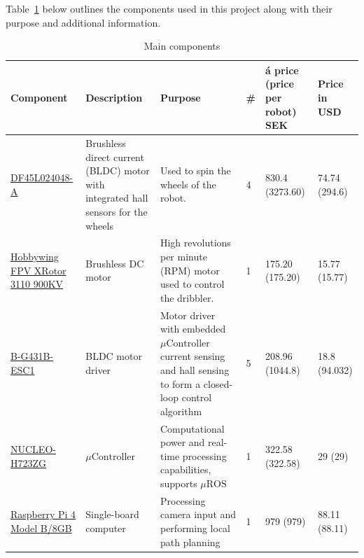 \documentclass[a4paper,8pt]{article}
\begin{document}
Table~\ref{table:bom} below outlines the components used in this project along
with their purpose and additional information.
\begin{center}
	\begin{longtable}{|p{3cm}|p{3cm}|p{3cm}|p{1cm}|p{3cm}|p{3cm}|}
		\caption{Main components}
    \label{table:bom}
		\\ \hline \rowcolor{gray!50} \textbf{Component} & \textbf{Description} & \textbf{Purpose} & \textbf{\#} & \textbf{á price (price per robot) SEK} & \textbf{Price in USD}\\ \endhead \hline


		\href{https://www.nanotec.com/fileadmin/files/Datenblaetter/BLDC/DF45/DF45L024048-A.pdf?1656012533}{DF45L024048-A}              & Brushless direct current (BLDC) motor with integrated hall sensors for the wheels & Used to spin the wheels of the robot.                                                                                      & 4  & 830.4 (3273.60) & 74.74 (294.6) \\ \hline
		\href{https://www.hobbywing.com/en/products/xrotor3110}{Hobbywing FPV XRotor 3110 900KV}                                        & Brushless DC motor                                                                & High revolutions per minute (RPM) motor used to control the dribbler.                                                      & 1  & 175.20 (175.20) & 15.77 (15.77) \\ \hline
		\href{https://www.mouser.se/datasheet/2/389/b-g431b-esc1-1848063.pdf}{B-G431B-ESC1}                                             & BLDC motor driver                                                                 & Motor driver with embedded $\mu\text{Controller}$ current sensing and hall sensing to form a closed-loop control algorithm & 5  & 208.96 (1044.8) & 18.8 (94.032) \\ \hline
		\href{https://www.st.com/en/evaluation-tools/nucleo-h723zg.html}{NUCLEO-H723ZG}                                                 & $\mu\text{Controller}$                                                            & Computational power and real-time processing capabilities, supports $\mu\text{ROS}$                                        & 1  & 322.58 (322.58) & 29 (29)       \\ \hline
		\href{https://datasheets.raspberrypi.com/rpi4/raspberry-pi-4-datasheet.pdf}{Raspberry Pi 4 Model B/8GB}                         & Single-board computer                                                             & Processing camera input and performing local path planning                                                                 & 1  & 979 (979)       & 88.11 (88.11) \\ \hline

\end{longtable}
\end{center}
\end{document}
